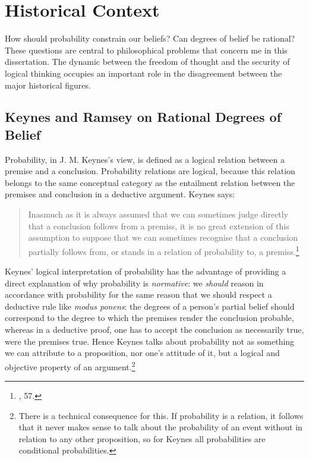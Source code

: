 \hypertarget{historical-context}{%
\section{Historical Context}\label{historical-context}}

How should probability constrain our beliefs? Can degrees of belief be
rational? These questions are central to philosophical problems that concern me in this dissertation. The dynamic between the freedom of thought and the security of logical thinking occupies an important role in the disagreement between the major historical figures.

\hypertarget{rational-degrees-of-belief}{%
\subsection{Keynes and Ramsey on Rational Degrees of
Belief}\label{sec:rational-degrees-of-belief}}

Probability, in J. M. Keynes's view, is defined as a logical relation between
a premise and a conclusion. Probability relations are logical, because
this relation belongs to the same conceptual category as the entailment
relation between the premises and conclusion in a deductive argument.
Keynes says:

\begin{quote}
Inasmuch as it is always assumed that we can sometimes judge directly
that a conclusion follows from a premiss, it is no great extension of
this assumption to suppose that we can sometimes recognise that a
conclusion partially follows from, or stands in a relation of
probability to, a premiss.\footnote{\cite{keynes}, 57.}
\end{quote}

Keynes' logical interpretation of probability has the advantage of
providing a direct explanation of why probability is \emph{normative}:
we \emph{should} reason in accordance with probability for the same reason
that we should respect a deductive rule like \emph{modus ponens}: the
degrees of a person's partial belief should correspond to the degree to
which the premises render the conclusion probable, whereas in a
deductive proof, one has to accept the conclusion as necessarily true,
were the premises true. Hence Keynes talks about probability not as
something we can attribute to a proposition, nor one's attitude of it,
but a logical and objective property of an argument.\footnote{There is a technical
  consequence for this. If probability is a relation, it follows that it
  never makes sense to talk about the probability of an event without in
  relation to any other proposition, so for Keynes all probabilities are
  conditional probabilities.}

